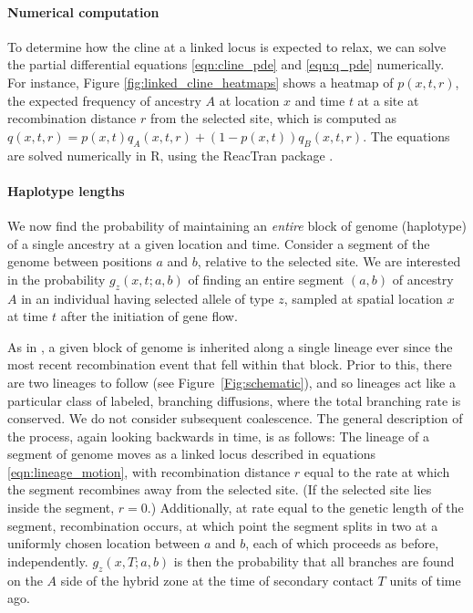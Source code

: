 \documentclass[11pt,letterpaper]{article}
\begin{document}
\paragraph{Numerical computation}
To determine how the cline at a linked locus is expected to relax,
we can solve the partial differential equations \eqref{eqn:cline_pde} and \eqref{eqn:q_pde} numerically.
For instance, Figure \ref{fig:linked_cline_heatmaps} shows a heatmap of $p(x,t,r)$, 
the expected frequency of ancestry $A$ at location $x$ and time $t$ 
at a site at recombination distance $r$ from the selected site,
which is computed as $q(x,t,r) = p(x,t) q_A(x,t,r) + (1-p(x,t)) q_B(x,t,r)$. 
The equations are solved numerically in R, using the ReacTran package \citep{soetaert2012reactive}.

\paragraph{Haplotype lengths}
We now find the probability of maintaining an \emph{entire} block of genome (haplotype) %
of a single ancestry at a given location and time.
Consider a segment of the genome between positions $a$ and $b$, relative to the selected site. 
We are interested in the probability $g_z(x,t;a,b)$ 
of finding an entire segment $(a,b)$ of ancestry $A$ in an individual having selected allele of type $z$,
sampled at spatial location $x$ at time $t$ after the initiation of gene flow. %

As in \citet{sedghifar2015spatial}, 
a given block of genome is inherited along a single lineage ever since the most recent recombination event
that fell within that block.
Prior to this, there are two lineages to follow (see Figure~\ref{Fig:schematic}),
and so lineages act like a particular class of labeled, branching diffusions,
where the total branching rate is conserved. 
We do not consider subsequent coalescence.
The general description of the process, again looking backwards in time, is as follows:
The lineage of a segment of genome moves as a linked locus described in equations \eqref{eqn:lineage_motion},
with recombination distance $r$ equal to the rate at which the segment recombines away from the selected site.
(If the selected site lies inside the segment, $r=0$.)
Additionally, at rate equal to the genetic length of the segment,
recombination occurs, at which point the segment splits in two at a uniformly chosen location between $a$ and $b$,
each of which proceeds as before, independently. 
$g_z(x,T;a,b)$ is then the probability that all branches are found on the $A$ side of the hybrid zone
at the time of secondary contact $T$ units of time ago.
\end{document}
